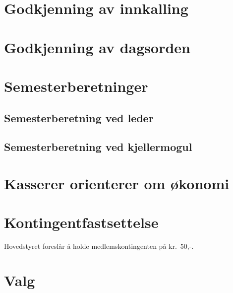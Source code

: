 \documentclass[10pt,norsk,a4paper,usenames,dvipsnames]{article}
\begin{document}
\section{Godkjenning av innkalling}


\section{Godkjenning av dagsorden}

\section{Semesterberetninger}
    \subsection{Semesterberetning ved leder}
    \subsection{Semesterberetning ved kjellermogul}


\section{Kasserer orienterer om økonomi}


\section{Kontingentfastsettelse}
    Hovedstyret foreslår å holde medlemskontingenten på kr.~50,-.


\section{Valg}
\end{document}

